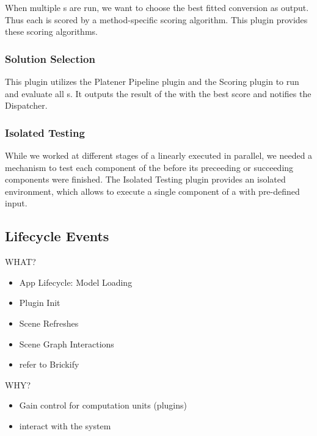 \documentclass[../ClassicThesis.tex]{subfiles}
\begin{document}
When multiple {\fabmethod}s are run, we want to choose the best fitted
conversion as output. Thus each {\fabmethod} is scored by a method-specific
scoring algorithm. This plugin provides these scoring algorithms.

\subsubsection{Solution Selection}

This plugin utilizes the Platener Pipeline plugin and the Scoring plugin to run
and evaluate all {\fabmethod}s. It outputs the result of the {\fabmethod} with
the best score and notifies the Dispatcher.

\subsubsection{Isolated Testing}

While we worked at different stages of a linearly executed {\fabmethod} in
parallel, we needed a mechanism to test each component of the {\fabmethod}
before its preceeding or succeeding components were finished. The Isolated
Testing plugin provides an isolated environment, which allows to execute a
single component of a {\fabmethod} with pre-defined input.


\subsection{Lifecycle Events}

WHAT?

\begin{itemize}
\item App Lifecycle: Model Loading
\item Plugin Init
\item Scene Refreshes
\item Scene Graph Interactions
\item refer to Brickify
\end{itemize}

WHY?

\begin{itemize}
\item Gain control for computation units (plugins)
\item interact with the system
\end{itemize}
\end{document}
